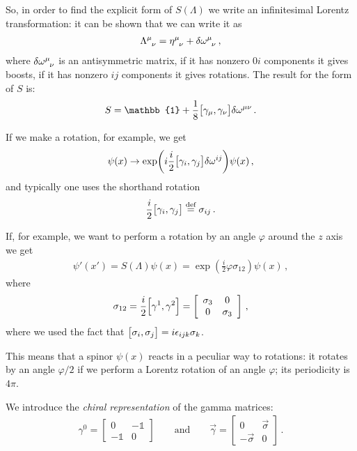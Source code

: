 \documentclass[main.tex]{subfiles}
\begin{document}
So, in order to find the explicit form of \(S(\Lambda )\) we write an infinitesimal Lorentz transformation: it can be shown that we can write it as
%
\begin{align}
\tensor{\Lambda }{^{\mu }_{\nu }} = \tensor{\eta }{^{\mu }_{\nu }} + \delta \tensor{\omega}{^{\mu }_{\nu }}
\,,
\end{align}
%
where \(\delta \tensor{\omega }{^{\mu }_{\nu }}\) is an antisymmetric matrix, if it has nonzero \(0i\) components it gives boosts, if it has nonzero \(ij\) components it gives rotations. 
The result for the form of \(S\) is:
%
\begin{align}
S = \mathbb{1} + \frac{1}{8 } \qty[\gamma_{\mu }, \gamma_{\nu }] \delta \tensor{\omega }{^{\mu \nu }}
\,.
\end{align}

If we make a rotation, for example, we get 
%
\begin{align}
\psi (x) \rightarrow \exp(i \frac{i}{2} \qty[\gamma_{i}, \gamma_{j}] \delta \tensor{\omega }{^{ij}}) \psi (x) 
\,,
\end{align}
%
and typically one uses the shorthand rotation 
%
\begin{align}
\frac{i}{2} \qty[\gamma_{i}, \gamma_{j}] \overset{\text{def}}{=} \sigma_{ij}
\,.
\end{align}

If, for example, we want to perform a rotation by an angle \(\varphi \) around the \(z\) axis we get 
%
\begin{align}
\psi' (x') = S(\Lambda) \psi (x) = \exp( \frac{i}{2} \varphi \sigma_{12}) \psi (x)
\,,
\end{align}
%
where 
%
\begin{align}
\sigma_{12} = \frac{i}{2} \qty[\gamma^{1}, \gamma^{2}]
= \left[\begin{array}{cc}
\sigma_3 & 0 \\ 
0 & \sigma_3 
\end{array}\right]
\,,
\end{align}
%
where we used the fact that \(\qty[\sigma_i, \sigma_{j}] = i \epsilon_{ijk}\sigma_{k}\). 

This means that a spinor \(\psi (x)\) reacts in a peculiar way to rotations: it rotates by an angle \( \varphi /2 \) if we perform a Lorentz rotation of an angle \(\varphi \); its periodicity is \(4\pi \).  

We introduce the \emph{chiral representation} of the gamma matrices: 
%
\begin{subequations}
\begin{align}
\gamma^{0} = \left[\begin{array}{cc}
0 & -\mathbb{1} \\ 
- \mathbb{1} & 0
\end{array}\right]
\qquad \text{and} \qquad
\vec{\gamma} = \left[\begin{array}{cc}
0 & \vec{\sigma}  \\ 
-\vec{\sigma} & 0
\end{array}\right]
\,.
\end{align}
\end{subequations}
\end{document}

